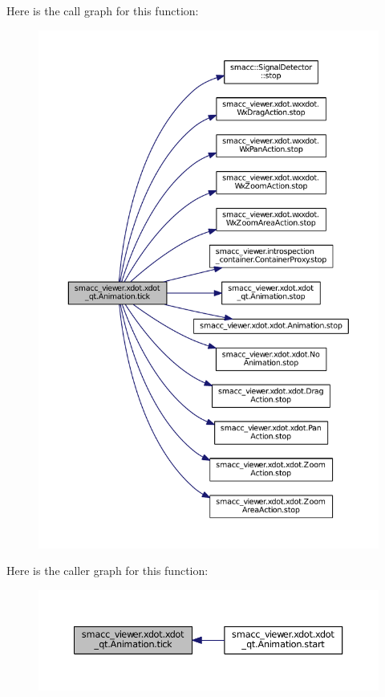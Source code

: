 Here is the call graph for this function\+:
\nopagebreak
\begin{figure}[H]
\begin{center}
\leavevmode
\includegraphics[width=350pt]{classsmacc__viewer_1_1xdot_1_1xdot__qt_1_1Animation_a9f6f08e355fca56a746949121d36a47d_cgraph}
\end{center}
\end{figure}




Here is the caller graph for this function\+:
\nopagebreak
\begin{figure}[H]
\begin{center}
\leavevmode
\includegraphics[width=350pt]{classsmacc__viewer_1_1xdot_1_1xdot__qt_1_1Animation_a9f6f08e355fca56a746949121d36a47d_icgraph}
\end{center}
\end{figure}




